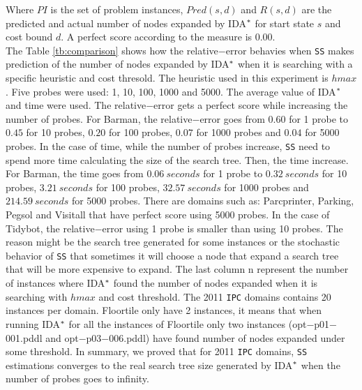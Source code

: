 Where $PI$ is the set of problem instances, $Pred(s,d)$ and $R(s,d)$ are the predicted and actual number of nodes expanded by IDA$\sp{*}$ for start state $s$ and cost bound $d$. A perfect score according to the measure is $0.00$.\\

The Table \ref{tb:comparison} shows how the relative$-$error behavies when \texttt{SS} makes prediction of the number of nodes expanded by IDA$\sp{*}$ when it is searching with a specific heuristic and cost thresold. The heuristic used in this experiment is $hmax$. Five probes were used: 1, 10, 100, 1000 and 5000. The average value of IDA$\sp{*}$ and time were used. The relative$-$error gets a perfect score while increasing the number of probes. For Barman, the relative$-$error goes from $0.60$ for 1 probe to $0.45$ for 10 probes, $0.20$ for 100 probes, $0.07$ for 1000 probes and $0.04$ for 5000 probes. In the case of time, while the number of probes increase, \texttt{SS} need to spend more time calculating the size of the search tree. Then, the time increase. For Barman, the time goes from $0.06\ seconds$ for 1 probe to $0.32\ seconds$ for 10 probes, $3.21\ seconds$ for 100 probes, $32.57\ seconds$ for 1000 probes and $214.59\ seconds$ for 5000 probes. There are domains such as: Parcprinter, Parking, Pegsol and Visitall that have perfect score using 5000 probes. In the case of Tidybot, the relative$-$error using 1 probe is smaller than using 10 probes. The reason might be the search tree generated for some instances or the stochastic behavior of \texttt{SS} that sometimes it will choose a node that expand a search tree that will be more expensive to expand. The last column \textsf{n} represent the number of instances where IDA$\sp{*}$ found the number of nodes expanded when it is searching with $hmax$ and cost threshold. The 2011 \texttt{IPC} domains contains 20 instances per domain. Floortile only have 2 instances, it means that when running IDA$\sp{*}$ for all the instances of Floortile only two instances (opt$-$p01$-$001.pddl and opt$-$p03$-$006.pddl) have found number of nodes expanded under some threshold. In summary, we proved that for 2011 \texttt{IPC} domains, \texttt{SS} estimations converges to the real search tree size generated by IDA$\sp{*}$ when the number of probes goes to infinity.

